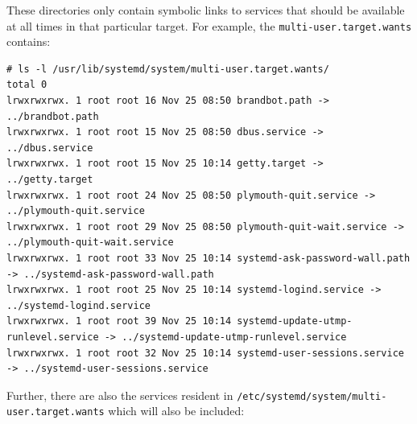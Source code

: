 These directories only contain symbolic links to services that should be available at all times in that particular target. For example, the \verb|multi-user.target.wants| contains:

\vspace{-15pt}
\begin{verbatim}
# ls -l /usr/lib/systemd/system/multi-user.target.wants/
total 0
lrwxrwxrwx. 1 root root 16 Nov 25 08:50 brandbot.path -> ../brandbot.path
lrwxrwxrwx. 1 root root 15 Nov 25 08:50 dbus.service -> ../dbus.service
lrwxrwxrwx. 1 root root 15 Nov 25 10:14 getty.target -> ../getty.target
lrwxrwxrwx. 1 root root 24 Nov 25 08:50 plymouth-quit.service -> ../plymouth-quit.service
lrwxrwxrwx. 1 root root 29 Nov 25 08:50 plymouth-quit-wait.service -> ../plymouth-quit-wait.service
lrwxrwxrwx. 1 root root 33 Nov 25 10:14 systemd-ask-password-wall.path -> ../systemd-ask-password-wall.path
lrwxrwxrwx. 1 root root 25 Nov 25 10:14 systemd-logind.service -> ../systemd-logind.service
lrwxrwxrwx. 1 root root 39 Nov 25 10:14 systemd-update-utmp-runlevel.service -> ../systemd-update-utmp-runlevel.service
lrwxrwxrwx. 1 root root 32 Nov 25 10:14 systemd-user-sessions.service -> ../systemd-user-sessions.service
\end{verbatim}
\vspace{-10pt}

\noindent
Further, there are also the services resident in \verb|/etc/systemd/system/multi-user.target.wants| which will also be included:

